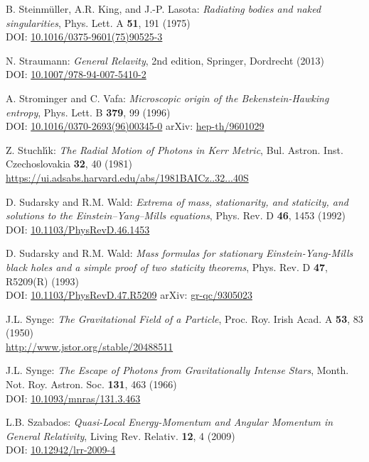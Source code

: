 \begin{thebibliography}{123}
B. Steinmüller, A.R. King, and J.-P. Lasota:
{\em Radiating bodies and naked singularities},
Phys. Lett. A {\bf 51}, 191 (1975)\\
DOI: \href{https://doi.org/10.1016/0375-9601(75)90525-3}{10.1016/0375-9601(75)90525-3}

N. Straumann:
{\em General Relavity}, 2nd edition,
Springer, Dordrecht (2013)\\
DOI: \href{https://doi.org/10.1007/978-94-007-5410-2}{10.1007/978-94-007-5410-2}

A. Strominger and C. Vafa:
{\em Microscopic origin of the Bekenstein-Hawking entropy},
Phys. Lett. B {\bf 379}, 99 (1996)\\
DOI: \href{https://doi.org/10.1016/0370-2693(96)00345-0}{10.1016/0370-2693(96)00345-0}\hfill
arXiv: \href{https://arxiv.org/abs/hep-th/9601029}{hep-th/9601029}

Z. Stuchl\'{\i}k: {\em The Radial Motion of Photons in Kerr Metric},
Bul. Astron. Inst. Czechoslovakia {\bf 32}, 40 (1981)\\
\url{https://ui.adsabs.harvard.edu/abs/1981BAICz..32...40S}

D. Sudarsky and R.M. Wald: {\em Extrema of mass, stationarity, and staticity,
and solutions to the Einstein–Yang–Mills equations},
Phys. Rev. D {\bf 46}, 1453 (1992)\\
DOI: \href{https://doi.org/10.1103/PhysRevD.46.1453}{10.1103/PhysRevD.46.1453}

D. Sudarsky and R.M. Wald:
{\em Mass formulas for stationary Einstein-Yang-Mills black holes and a simple proof of two staticity theorems},
Phys. Rev. D {\bf 47}, R5209(R) (1993)\\
DOI: \href{https://doi.org/10.1103/PhysRevD.47.R5209}{10.1103/PhysRevD.47.R5209}\hfill
arXiv: \href{https://arxiv.org/abs/gr-qc/9305023}{gr-qc/9305023}

J.L. Synge: {\em The Gravitational Field of a Particle},
Proc. Roy. Irish Acad. A {\bf 53}, 83 (1950)\\
\url{http://www.jstor.org/stable/20488511}

J.L. Synge: {\em The Escape of Photons from Gravitationally Intense Stars},
Month. Not. Roy. Astron. Soc. {\bf 131}, 463 (1966)\\
DOI: \href{https://doi.org/10.1093/mnras/131.3.463}{10.1093/mnras/131.3.463}

L.B. Szabados:
{\em Quasi-Local Energy-Momentum and Angular Momentum in General Relativity},
Living Rev. Relativ. {\bf 12}, 4 (2009)\\
DOI: \href{https://doi.org/10.12942/lrr-2009-4}{10.12942/lrr-2009-4}


\end{thebibliography}
